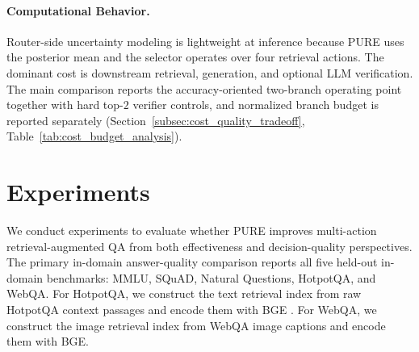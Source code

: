 \documentclass[a4paper,fleqn]{cas-dc}
\begin{document}
\paragraph{Computational Behavior.}
Router-side uncertainty modeling is lightweight at inference because PURE uses the posterior mean and the selector operates over four retrieval actions. The dominant cost is downstream retrieval, generation, and optional LLM verification. The main comparison reports the accuracy-oriented two-branch operating point together with hard top-$2$ verifier controls, and normalized branch budget is reported separately (Section~\ref{subsec:cost_quality_tradeoff}, Table~\ref{tab:cost_budget_analysis}).




\section{Experiments}
\label{sec:experiments}

We conduct experiments to evaluate whether PURE improves multi-action retrieval-augmented QA from both effectiveness and decision-quality perspectives. The primary in-domain answer-quality comparison reports all five held-out in-domain benchmarks: MMLU, SQuAD, Natural Questions, HotpotQA, and WebQA. For HotpotQA, we construct the text retrieval index from raw HotpotQA context passages and encode them with BGE \citep{Xiao2024CPack}. For WebQA, we construct the image retrieval index from WebQA image captions and encode them with BGE.
\end{document}
